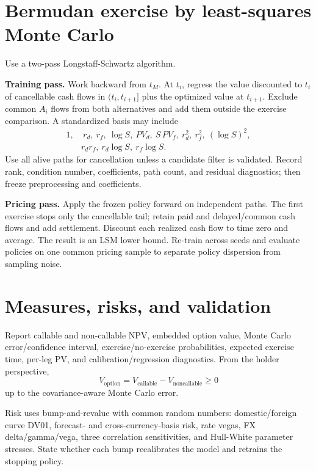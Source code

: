 \documentclass[conference]{IEEEtran}
\begin{document}
\section{Bermudan exercise by least-squares Monte Carlo}

Use a two-pass Longstaff-Schwartz algorithm.

\textbf{Training pass.} Work backward from $t_M$. At $t_i$, regress the value discounted to $t_i$ of cancellable cash flows in $(t_i,t_{i+1}]$ plus the optimized value at $t_{i+1}$. Exclude common $A_i$ flows from both alternatives and add them outside the exercise comparison. A standardized basis may include
\[
\begin{aligned}
1,&\ r_d,\ r_f,\ \log S,\ PV_d,\ S\,PV_f,\ r_d^2,\ r_f^2,\ (\log S)^2,\\
& r_dr_f,\ r_d\log S,\ r_f\log S.
\end{aligned}
\]
Use all alive paths for cancellation unless a candidate filter is validated. Record rank, condition number, coefficients, path count, and residual diagnostics; then freeze preprocessing and coefficients.

\textbf{Pricing pass.} Apply the frozen policy forward on independent paths. The first exercise stops only the cancellable tail; retain paid and delayed/common cash flows and add settlement. Discount each realized cash flow to time zero and average. The result is an LSM lower bound. Re-train across seeds and evaluate policies on one common pricing sample to separate policy dispersion from sampling noise.

\section{Measures, risks, and validation}

Report callable and non-callable NPV, embedded option value, Monte Carlo error/confidence interval, exercise/no-exercise probabilities, expected exercise time, per-leg PV, and calibration/regression diagnostics. From the holder perspective,
\[
  V_{\mathrm{option}}=V_{\mathrm{callable}}-V_{\mathrm{noncallable}}\ge0
\]
up to the covariance-aware Monte Carlo error.

Risk uses bump-and-revalue with common random numbers: domestic/foreign curve DV01, forecast- and cross-currency-basis risk, rate vegas, FX delta/gamma/vega, three correlation sensitivities, and Hull-White parameter stresses. State whether each bump recalibrates the model and retrains the stopping policy.
\end{document}
